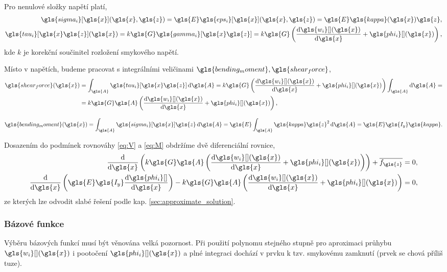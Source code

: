 Pro nenulové složky napětí platí,
\begin{align}
    \gls{sigma_i}[\gls{x}](\gls{x}, \gls{z}) = \gls{E} \gls{eps_i}[\gls{x}](\gls{x}, \gls{z}) = \gls{E}\gls{kappa}(\gls{x}) \gls{z},\\
    \gls{tau_i}[\gls{x}\gls{z}](\gls{x}) = k \gls{G} \gls{gamma_i}[\gls{x}\gls{z}] = k \gls{G} \left(\dv{\gls{w_i}[ ](\gls{x})}{\gls{x}} + \gls{phi_i}[ ](\gls{x})\right),
\end{align}
kde $k$ je korekční součinitel rozložení smykového napětí.

Místo v napětích, budeme pracovat s integrálními veličinami $\gls{bending_moment}, \gls{shear_force}$,
\begin{equation}
    \begin{split} \label{eq:tim_shear_force}
        \gls{shear_force}(\gls{x}) 
        & = 
        \int_{\gls{A}} \gls{tau_i}[\gls{x}\gls{z}] \dd{\gls{A}}
        = k \gls{G} \left(\dv{\gls{w_i}[ ](\gls{x})}{\gls{x}} + \gls{phi_i}[ ](\gls{x}) \right) \int_{\gls{A}} \dd{\gls{A}} = \\
        & =
        k \gls{G} \gls{A}  \left(\dv{\gls{w_i}[ ](\gls{x})}{\gls{x}} + \gls{phi_i}[ ](\gls{x}) \right),
    \end{split}
\end{equation}

\begin{equation}    
    \gls{bending_moment}(\gls{x})
    =
    \int_{\gls{A}} \gls{sigma_i}[\gls{x}] \gls{z} \dd{\gls{A}}
    =
    \gls{E} \int_{\gls{A}} \gls{kappa} \gls{z}^2 \dd{\gls{A}}
    =
    \gls{E} \gls{I_y} \gls{kappa}.
\end{equation}

Dosazením do podmínek rovnováhy \ref{eq:V} a \ref{eq:M} obdržíme dvě diferenciální rovnice,
\begin{align}
    \dv{\gls{x}} \left( k \gls{G} \gls{A}  \left(\dv{\gls{w_i}[ ](\gls{x})}{\gls{x}} + \gls{phi_i}[ ](\gls{x}) \right) \right) + \overline{f_{\gls{z}}} = 0, \\
    \dv{\gls{x}} \left( \gls{E} \gls{I_y} \dv{\gls{phi_i}[ ]}{\gls{x}} \right) - k \gls{G} \gls{A}  \left(\dv{\gls{w_i}[ ](\gls{x})}{\gls{x}} + \gls{phi_i}[ ](\gls{x}) \right) = 0,
\end{align}
ze kterých lze odvodit slabé řešení podle kap. \ref{sec:approximate_solution}. 

\subsubsection*{Bázové funkce}
Výběru bázových funkcí musí být věnována velká pozornost. Při použití polynomu stejného stupně pro aproximaci průhybu $\gls{w_i}[ ](\gls{x})$ i pootočení $\gls{phi_i}[ ](\gls{x})$ a plné integraci dochází v prvku k tzv. smykovému zamknutí (prvek se chová příliš tuze).


